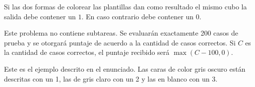 \documentclass{oci}
\begin{document}
\begin{outputDescription}
  Si las dos formas de colorear las plantillas dan como resultado el mismo cubo la salida debe
  contener un $1$.
  En caso contrario debe contener un $0$.
\end{outputDescription}

\begin{scoreDescription}
  Este problema no contiene subtareas.
  Se evaluarán exactamente 200 casos de prueba y se otorgará puntaje de acuerdo a la cantidad de
  casos correctos.
  Si $C$ es la cantidad de casos correctos, el puntaje recibido será $\max(C-100,0)$. 
\end{scoreDescription}

\begin{sampleDescription}
\vspace{-1em}
    Este es el ejemplo descrito en el enunciado.
    Las caras de color gris oscuro están descritas con un 1, las de gris claro con un 2 y las en
    blanco con un 3.
\vspace{1em}

\end{sampleDescription}
\end{document}
